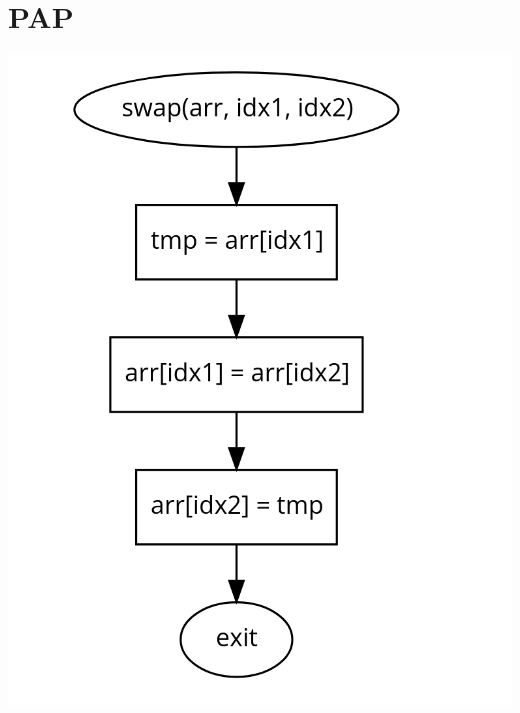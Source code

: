 \documentclass[11pt]{article}
\begin{document}
\section{PAP}
\begin{center}
    \includegraphics[scale=0.5]{swap.png}\\
\end{center}
\end{document}
